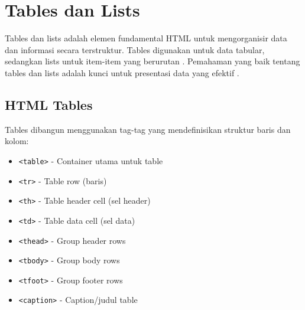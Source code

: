\section{Tables dan Lists}

Tables dan lists adalah elemen fundamental HTML untuk mengorganisir data dan informasi secara terstruktur. Tables digunakan untuk data tabular, sedangkan lists untuk item-item yang berurutan \cite{w3schools-html}. Pemahaman yang baik tentang tables dan lists adalah kunci untuk presentasi data yang efektif \cite{mdn-html}.

\subsection{HTML Tables}

Tables dibangun menggunakan tag-tag yang mendefinisikan struktur baris dan kolom:

\begin{itemize}
  \item \texttt{<table>} - Container utama untuk table
  \item \texttt{<tr>} - Table row (baris)
  \item \texttt{<th>} - Table header cell (sel header)
  \item \texttt{<td>} - Table data cell (sel data)
  \item \texttt{<thead>} - Group header rows
  \item \texttt{<tbody>} - Group body rows
  \item \texttt{<tfoot>} - Group footer rows
  \item \texttt{<caption>} - Caption/judul table
\end{itemize}

